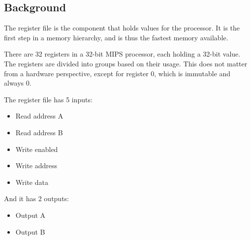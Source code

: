 \documentclass{beamer}
\begin{document}
\subsection{Background}
\begin{frame}
    The register file is the component that holds values for the processor. It
    is the first step in a memory hierarchy, and is thus the fastest memory
    available.

    \vspace{\baselineskip}
    There are 32 registers in a 32-bit MIPS processor, each holding a 32-bit
    value. The registers are divided into groups based on their usage. This
    does not matter from a hardware perspective, except for register 0, which
    is immutable and always 0.
\end{frame}
\begin{frame}
    The register file has 5 inputs:
    \begin{itemize}
        \item Read address A
        \item Read address B
        \item Write enabled
        \item Write address
        \item Write data
    \end{itemize}
    And it has 2 outputs:
    \begin{itemize}
        \item Output A
        \item Output B
    \end{itemize}
\end{frame}
\end{document}
